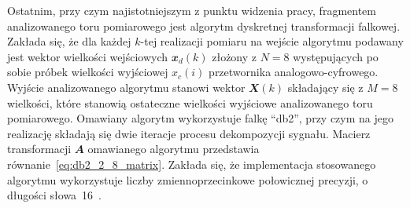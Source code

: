 Ostatnim, przy czym najistotniejszym z punktu widzenia pracy, fragmentem analizowanego toru pomiarowego jest algorytm dyskretnej transformacji falkowej. Zakłada się, że dla każdej $k$-tej realizacji pomiaru na wejście algorytmu podawany jest wektor wielkości wejściowych $\mathbfit{x}_{d}(k)$ złożony z $N = 8$ występujących po sobie próbek wielkości wyjściowej $x_{c}(i)$ przetwornika analogowo-cyfrowego. Wyjście analizowanego algorytmu stanowi wektor $\mathbfit{X}(k)$ składający się z $M = 8$ wielkości, które stanowią ostateczne wielkości wyjściowe analizowanego toru pomiarowego. Omawiany algorytm wykorzystuje falkę \enquote{db2}, przy czym na jego realizację składają się dwie iteracje procesu dekompozycji sygnału. Macierz transformacji $\mathbfit{A}$ omawianego algorytmu przedstawia równanie~\eqref{eq:db2_2_8_matrix}. Zakłada się, że implementacja stosowanego algorytmu wykorzystuje liczby zmiennoprzecinkowe połowicznej precyzji, o długości słowa~\qty{16}{\bitOw}~\cite{gcc_manual}.

